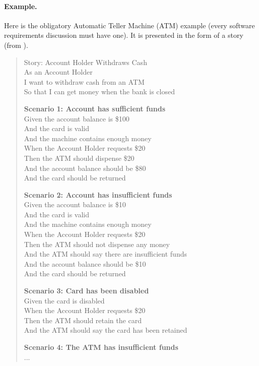\paragraph{Example.} Here is the obligatory Automatic Teller Machine (ATM) example (every software requirements discussion must have one). It is presented in the form of a story (from \cite{bdd2}).

\begin{quote}
Story: Account Holder Withdraws Cash\\

As an Account Holder\\
I want to withdraw cash from an ATM\\
So that I can get money when the bank is closed

\textbf{Scenario 1: Account has sufficient funds}\\
Given the account balance is \$100\\
 And the card is valid\\
 And the machine contains enough money\\
When the Account Holder requests \$20\\
Then the ATM should dispense \$20\\
 And the account balance should be \$80\\
 And the card should be returned

\textbf{Scenario 2: Account has insufficient funds}\\
Given the account balance is \$10\\
 And the card is valid\\
 And the machine contains enough money\\
When the Account Holder requests \$20\\
Then the ATM should not dispense any money\\
 And the ATM should say there are insufficient funds\\
 And the account balance should be \$10\\
 And the card should be returned

\textbf{Scenario 3: Card has been disabled}\\
Given the card is disabled\\
When the Account Holder requests \$20\\
Then the ATM should retain the card\\
And the ATM should say the card has been retained

\textbf{Scenario 4: The ATM has insufficient funds}\\
...

\end{quote}

